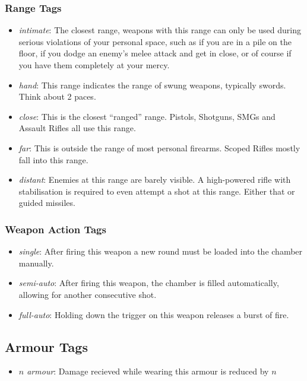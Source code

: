 \subsubsection{Range Tags}
\begin{itemize}
\item \textit{intimate}: The closest range, weapons with this range can only be used during serious violations of your personal space, such as if you are in a pile on the floor, if you dodge an enemy's melee attack and get in close, or of course if you have them completely at your mercy.
\item \textit{hand}: This range indicates the range of swung weapons, typically swords. Think about 2 paces.
\item \textit{close}: This is the closest ``ranged'' range. Pistols, Shotguns, SMGs and Assault Rifles all use this range.
\item \textit{far}: This is outside the range of most personal firearms. Scoped Rifles mostly fall into this range.
\item \textit{distant}: Enemies at this range are barely visible. A high-powered rifle with stabilisation is required to even attempt a shot at this range. Either that or guided missiles.
\end{itemize}

\subsubsection{Weapon Action Tags}
\begin{itemize}
\item \textit{single}: After firing this weapon a new round must be loaded into the chamber manually.
\item \textit{semi-auto}: After firing this weapon, the chamber is filled automatically, allowing for another consecutive shot.
\item \textit{full-auto}: Holding down the trigger on this weapon releases a burst of fire.
\end{itemize}

\subsection{Armour Tags}
\begin{itemize}
\item \textit{$n$ armour}: Damage recieved while wearing this armour is reduced by $n$
\end{itemize}